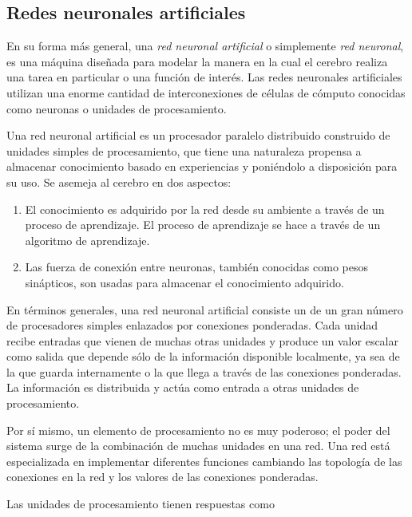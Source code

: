 \subsection{Redes neuronales artificiales}


En su forma más general, una \textit{red neuronal artificial} 
o simplemente \textit{red neuronal}, es una máquina diseñada para modelar la manera en la cual el cerebro 
realiza una tarea en particular o una función de interés. Las redes neuronales 
artificiales utilizan
una enorme cantidad de interconexiones de células de cómputo conocidas como neuronas o unidades de procesamiento.\\


\begin{remark}
Una red neuronal artificial es un procesador paralelo distribuido construido de unidades simples de
procesamiento, que tiene una naturaleza propensa a almacenar
conocimiento basado en experiencias y poniéndolo a disposición para su uso. Se 
asemeja al cerebro en dos aspectos:
\begin{enumerate}
    \item El conocimiento es adquirido por la red desde su ambiente a través de un proceso de aprendizaje. El proceso de aprendizaje se hace a través de un algoritmo de aprendizaje.
    \item Las fuerza de conexión entre neuronas, también conocidas como pesos sinápticos, son usadas para almacenar el conocimiento adquirido.
\end{enumerate}

\end{remark}

En términos generales, una red neuronal artificial consiste un de un gran número 
de procesadores simples enlazados por conexiones ponderadas.
Cada unidad recibe entradas que vienen de muchas otras unidades y 
produce un valor escalar como salida que depende sólo de la información
disponible localmente, ya sea de la que guarda internamente o la que llega
a través de las conexiones ponderadas. La información es distribuida 
y actúa como entrada a otras unidades de procesamiento.

Por sí mismo, un elemento de procesamiento no es muy poderoso; el poder
del sistema surge de la combinación de muchas unidades en una red.
Una red está especializada en implementar diferentes funciones cambiando las 
topología de las conexiones en la red y los valores de las
conexiones ponderadas.

Las unidades de procesamiento tienen respuestas como

